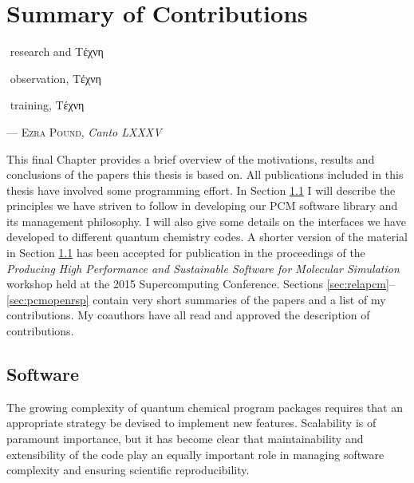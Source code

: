 \chapter{Summary of Contributions}\label{ch:contributions-summary}

\epigraph{\textonehalf\,\,research \kern 20pt and \textonehalf \kern 20pt \textgreek{Tέχνη}

          \textonehalf\,\,observation, \kern 21pt \textonehalf \kern 20pt \textgreek{Tέχνη}

          \textonehalf\,\,training, \kern 35pt \textonehalf \kern 20pt \textgreek{Tέχνη}
          }{
  --- \textsc{Ezra Pound}, \textit{Canto LXXXV}}

This final Chapter provides a brief overview of the motivations, results and
conclusions of the papers this thesis is based on.
All publications included in this thesis have involved some programming effort.
In Section \ref{sec:software} I will describe the principles we have
striven to follow in developing our \acrshort{PCM} software library and its
management philosophy.
I will also give some details on the interfaces we have developed to different
quantum chemistry codes.
A shorter version of the material in Section \ref{sec:software} has been
accepted for publication in the proceedings of the \emph{Producing High
Performance and Sustainable Software for Molecular Simulation} workshop
held at the 2015 Supercomputing Conference.\autocite{%
DiRemigio2016-es}
Sections \ref{sec:relapcm}--\ref{sec:pcmopenrsp} contain very short
summaries of the papers and a list of my contributions.
My coauthors have all read and approved the description of contributions.

\section{Software}\label{sec:software}

The growing complexity of quantum chemical program packages requires that an
appropriate strategy be devised to implement new features.
Scalability is of paramount importance, but it has become clear that
maintainability and extensibility of the code play an equally important role in
managing software complexity\autocite{Wilson2014-vh, ssi, nsf-s2i2,
netherlands-escience, coderefinery, molssi} and ensuring
scientific reproducibility.\autocite{Hatton1994-us, Hatton1997-ml,
Hatton1997-bb, Ioannidis2005-aj, Merali2010-uy, Prinz2011-kz}

